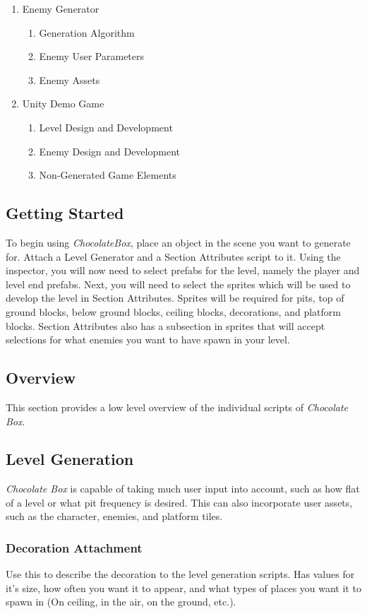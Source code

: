 \documentclass[pdftex,12pt,letter]{article}
\begin{document}
\begin{itemize}
\begin{itemize}
\begin{itemize}
\begin{itemize}
\begin{enumerate}
\item Enemy Generator
\begin{enumerate}
\item Generation Algorithm
\item Enemy User Parameters
\item Enemy Assets
\end{enumerate}

\item{Unity Demo Game}
\begin{enumerate}
\item Level Design and Development
\item Enemy Design and Development
\item Non-Generated Game Elements
\end{enumerate}
\end{enumerate}

\subsection{Getting Started}
To begin using \textit{ChocolateBox}, place an object in the scene you want to generate for. Attach a Level Generator and a Section Attributes script to it.  Using the inspector, you will now need to select prefabs for the level, namely the player and level end prefabs. Next, you will need to select the sprites which will be used to develop the level in Section Attributes. Sprites will be required for pits, top of ground blocks, below ground blocks, ceiling blocks, decorations, and platform blocks. Section Attributes also has a subsection in sprites that will accept selections for what enemies you want to have spawn in your level. 

\subsection{Overview}
This section provides a low level overview of the individual scripts of \textit{Chocolate Box}.
\subsection{Level Generation}
\textit{Chocolate Box} is capable of taking much user input into account, such as how flat of a level or what pit frequency is desired. This can also incorporate user assets, such as the character, enemies, and platform tiles. 
\subsubsection{Decoration Attachment}
Use this to describe the decoration to the level generation scripts. Has values for it's size, how often you want it to appear, and what types of places you want it to spawn in (On ceiling, in the air, on the ground, etc.).

\end{itemize}
\end{itemize}
\end{itemize}
\end{itemize}
\end{document}
